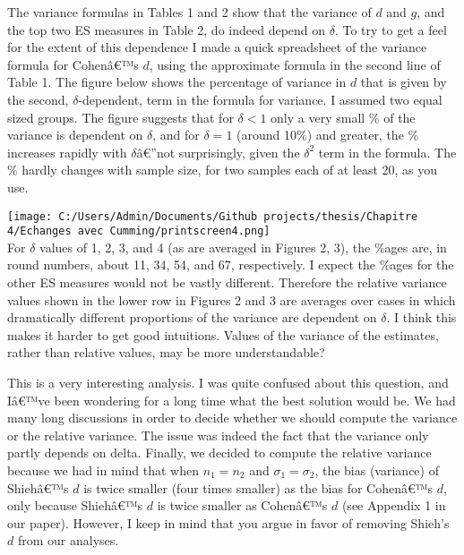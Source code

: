 \begin{appendix}
\color{black} The variance formulas in Tables 1 and 2 show that the
variance of \(d\) and \(g\), and the top two ES measures in Table 2, do
indeed depend on \(\delta\). To try to get a feel for the extent of this
dependence I made a quick spreadsheet of the variance formula for
Cohenâ€™s \(d\), using the approximate formula in the second line of
Table 1. The figure below shows the percentage of variance in \(d\) that
is given by the second, \(\delta\)-dependent, term in the formula for
variance. I assumed two equal sized groups. The figure suggests that for
\(\delta<1\) only a very small \(\%\) of the variance is dependent on
\(\delta\), and for \(\delta=1\) (around 10\(\%\)) and greater, the
\(\%\) increases rapidly with \(\delta\)â€''not surprisingly, given the
\(\delta^2\) term in the formula. The \(\%\) hardly changes with sample
size, for two samples each of at least 20, as you use.

\texttt{[image: C:/Users/Admin/Documents/Github projects/thesis/Chapitre 4/Echanges avec Cumming/printscreen4.png]}\\
For \(\delta\) values of 1, 2, 3, and 4 (as are averaged in Figures 2,
3), the \(\%\)ages are, in round numbers, about 11, 34, 54, and 67,
respectively. I expect the \(\%\)ages for the other ES measures would
not be vastly different. Therefore the relative variance values shown in
the lower row in Figures 2 and 3 are averages over cases in which
dramatically different proportions of the variance are dependent on
\(\delta\). I think this makes it harder to get good intuitions. Values
of the variance of the estimates, rather than relative values, may be
more understandable?

\color{blue} This is a very interesting analysis. I was quite confused
about this question, and Iâ€™ve been wondering for a long time what the
best solution would be. We had many long discussions in order to decide
whether we should compute the variance or the relative variance. The
issue was indeed the fact that the variance only partly depends on
delta. Finally, we decided to compute the relative variance because we
had in mind that when \(n_1=n_2\) and \(\sigma_1=\sigma_2\), the bias
(variance) of Shiehâ€™s \(d\) is twice smaller (four times smaller) as
the bias for Cohenâ€™s \(d\), only because Shiehâ€™s \(d\) is twice
smaller as Cohenâ€™s \(d\) (see Appendix 1 in our paper). However, I
keep in mind that you argue in favor of removing Shieh's \(d\) from our
analyses.


\end{appendix}
